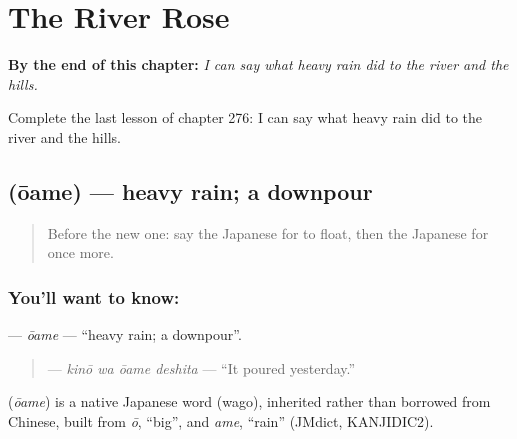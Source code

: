
\chapter{The River Rose}
\label{ch:ja-the-river-rose}

\begin{chapteropening}
\textbf{By the end of this chapter:} \emph{I can say what heavy rain did to the river and the hills.}

Complete the last lesson of chapter 276: I can say what heavy rain did to the river and the hills.
\end{chapteropening}

\section[\texorpdfstring{\ja{おおあめ} (ōame)}{おおあめ (ōame)}]{ (ōame) — heavy rain; a downpour}

\label{lesson:JA-C276-ouame}



\begin{quote}
Before the new one: say the Japanese for to float, then the Japanese for once more.
\end{quote}

\subsection*{You'll want to know: }
\textbf{} — \emph{ōame} — \textquotedblleft{}heavy rain; a downpour\textquotedblright{}.

\begin{quote}
\textbf{ } — \emph{kinō wa ōame deshita} — \textquotedblleft{}It poured yesterday.\textquotedblright{}
\end{quote}

\begin{cousinweb}
\textbf{} (\emph{ōame}) is a native Japanese word (wago), inherited rather than borrowed from Chinese, built from \emph{ō}, \textquotedblleft{}big\textquotedblright{}, and \emph{ame}, \textquotedblleft{}rain\textquotedblright{} (JMdict, KANJIDIC2).
\end{cousinweb}

